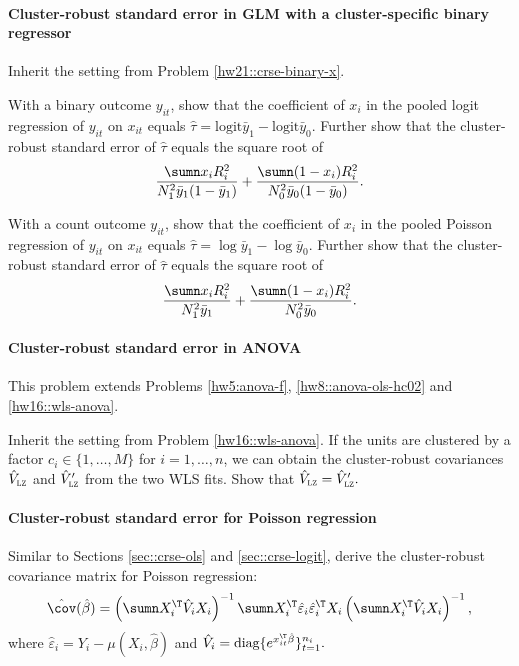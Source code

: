 \paragraph{Cluster-robust standard error in GLM with a cluster-specific binary regressor}\label{hw21::crse-binary-x-GLM}

Inherit the setting from Problem \ref{hw21::crse-binary-x}. 

With a binary outcome $y_{it}$, show that the coefficient of $x_i$ in the pooled logit regression of $y_{it}$ on $x_{it} $ equals $ \hat{\tau} =  \text{logit}\bar{y}_1 - \text{logit} \bar{y}_0$. Further show that the cluster-robust standard error of $ \hat{\tau}$ equals the square root of
$$
\frac{  \sumn x_i R_i^2 }{  N_1^2 \bar{y}_1(1-\bar{y}_1) }   
+ \frac{  \sumn (1-x_i) R_i^2 }{ N_0^2 \bar{y}_0 (1-\bar{y}_0) } . 
$$


With a count outcome $y_{it}$, show that the coefficient of $x_i$ in the pooled Poisson regression of $y_{it}$ on $x_{it} $ equals $ \hat{\tau} =  \log \bar{y}_1 -  \log \bar{y}_0$. Further show that the cluster-robust standard error of $ \hat{\tau}$ equals the square root of
$$
\frac{  \sumn x_i R_i^2 }{ N_1^2 \bar{y}_1  }   +  \frac{ \sumn (1-x_i) R_i^2 }{  N_0^2 \bar{y}_0   } . 
$$


\paragraph{Cluster-robust standard error in ANOVA}\label{hw21::crse-anova}


This problem extends Problems \ref{hw5:anova-f}, \ref{hw8::anova-ols-hc02} and \ref{hw16::wls-anova}. 

Inherit the setting from Problem \ref{hw16::wls-anova}. 
If the units are clustered by a factor $c_i \in \{1, \ldots, M\}$ for $i=1,\ldots, n$, we can obtain the cluster-robust covariances $\hat{V}_\textsc{lz}$ and $\hat{V}_\textsc{lz}'$ from the two WLS fits. Show that $\hat{V}_\textsc{lz} = \hat{V}_\textsc{lz}'.$  




 
\paragraph{Cluster-robust standard error for Poisson regression}\label{hw21::poisson-crse}

Similar to Sections \ref{sec::crse-ols} and \ref{sec::crse-logit}, derive the cluster-robust covariance matrix for Poisson regression:
\[
\hat{\cov}(\hat{\beta})=\left(\sumn X_{i}^{\T}\hat{V}_{i}X_{i}\right)^{-1}\sumn X_{i}^{\T}\hat{\varepsilon}_{i}\hat{\varepsilon}_{i}^{\T}X_{i}\left(\sumn X_{i}^{\T}\hat{V}_{i}X_{i}\right)^{-1},
\]
where $\hat{\varepsilon}_{i}=Y_{i}- \mu(X_{i}, \hat{\beta})$ and $\hat{V}_{i}=\text{diag}\{e^{x_{it}^{\T}\hat{\beta}}\}_{t=1}^{n_{i}}.$




